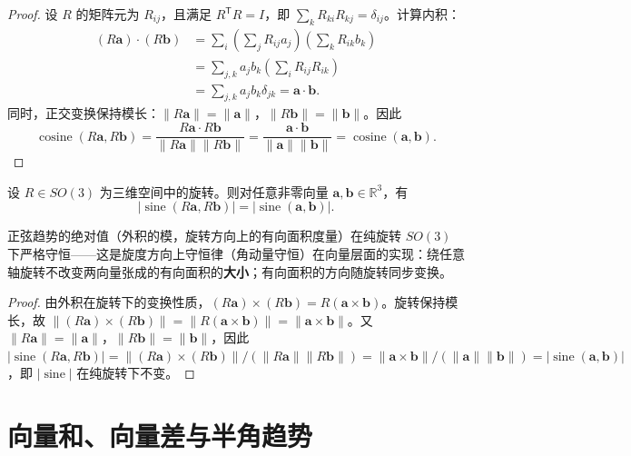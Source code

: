 \begin{proof}
设 $R$ 的矩阵元为 $R_{ij}$，且满足 $R^{\mathsf T}R = I$，即 $\sum_k R_{ki}R_{kj} = \delta_{ij}$。计算内积：
\begin{align*}
(R\mathbf{a}) \cdot (R\mathbf{b})
&= \sum_i \left( \sum_j R_{ij} a_j \right) \left( \sum_k R_{ik} b_k \right) \\
&= \sum_{j,k} a_j b_k \left( \sum_i R_{ij}R_{ik} \right) \\
&= \sum_{j,k} a_j b_k \delta_{jk}
= \mathbf{a} \cdot \mathbf{b}.
\end{align*}
同时，正交变换保持模长：$\|R\mathbf{a}\| = \|\mathbf{a}\|$，$\|R\mathbf{b}\| = \|\mathbf{b}\|$。因此
\[
\operatorname{cosine}(R\mathbf{a}, R\mathbf{b})
= \frac{R\mathbf{a} \cdot R\mathbf{b}}{\|R\mathbf{a}\| \|R\mathbf{b}\|}
= \frac{\mathbf{a} \cdot \mathbf{b}}{\|\mathbf{a}\| \|\mathbf{b}\|}
= \operatorname{cosine}(\mathbf{a}, \mathbf{b}).
\]
\end{proof}

\begin{proposition}\label{prop:sine_rotation}
设 $R \in SO(3)$ 为三维空间中的旋转。则对任意非零向量 $\mathbf{a},\mathbf{b} \in \mathbb{R}^3$，有
\[\lvert\operatorname{sine}(R\mathbf{a}, R\mathbf{b})\rvert = \lvert\operatorname{sine}(\mathbf{a}, \mathbf{b})\rvert.\]

正弦趋势的绝对值（外积的模，旋转方向上的有向面积度量）在纯旋转 $SO(3)$ 下严格守恒——这是旋度方向上守恒律（角动量守恒）在向量层面的实现：绕任意轴旋转不改变两向量张成的有向面积的\textbf{大小}；有向面积的方向随旋转同步变换。
\end{proposition}

\begin{proof}
由外积在旋转下的变换性质，$(R\mathbf{a}) \times (R\mathbf{b}) = R(\mathbf{a} \times \mathbf{b})$。旋转保持模长，故 $\|(R\mathbf{a}) \times (R\mathbf{b})\| = \|R(\mathbf{a} \times \mathbf{b})\| = \|\mathbf{a} \times \mathbf{b}\|$。又 $\|R\mathbf{a}\| = \|\mathbf{a}\|$，$\|R\mathbf{b}\| = \|\mathbf{b}\|$，因此 $\lvert\operatorname{sine}(R\mathbf{a}, R\mathbf{b})\rvert = \|(R\mathbf{a}) \times (R\mathbf{b})\| / (\|R\mathbf{a}\| \|R\mathbf{b}\|) = \|\mathbf{a} \times \mathbf{b}\| / (\|\mathbf{a}\| \|\mathbf{b}\|) = \lvert\operatorname{sine}(\mathbf{a}, \mathbf{b})\rvert$，即 $\lvert\operatorname{sine}\rvert$ 在纯旋转下不变。
\end{proof}

\section{\texorpdfstring{向量和、向量差与半角趋势}{向量和、向量差与半角趋势}}

